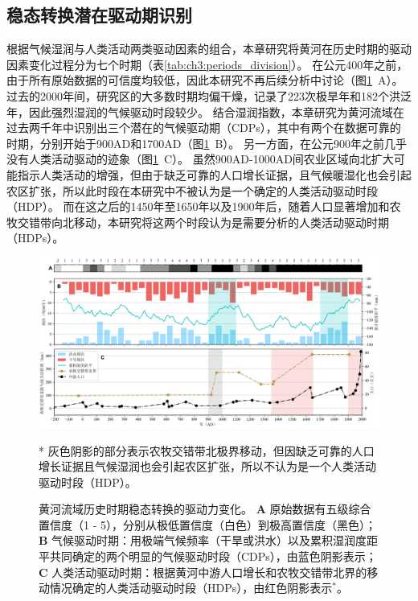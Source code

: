 
\subsection{稳态转换潜在驱动期识别}

根据气候湿润与人类活动两类驱动因素的组合，本章研究将黄河在历史时期的驱动因素变化过程分为七个时期（表\ref{tab:ch3:periods_division}）。
在公元400年之前，由于所有原始数据的可信度均较低，因此本研究不再后续分析中讨论（图\ref{fig:ch3:drivers}~A）。
过去的2000年间，研究区的大多数时期均偏干燥，记录了223次极旱年和182个洪泛年，因此强烈湿润的气候驱动时段较少。
结合湿润指数，本章研究为黄河流域在过去两千年中识别出三个潜在的气候驱动期（CDPs），其中有两个在数据可靠的时期，分别开始于900AD和1700AD（图\ref{fig:ch3:drivers}~B）。
另一方面，在公元900年之前几乎没有人类活动驱动的迹象（图\ref{fig:ch3:drivers}~C）。
虽然900AD-1000AD间农业区域向北扩大可能指示人类活动的增强，但由于缺乏可靠的人口增长证据，且气候暖湿化也会引起农区扩张，所以此时段在本研究中不被认为是一个确定的人类活动驱动时段（HDP）。
而在这之后的1450年至1650年以及1900年后，随着人口显著增加和农牧交错带向北移动，本研究将这两个时段认为是需要分析的人类活动驱动时期（HDPs）。



\begin{figure}[!ht]
    \includegraphics[width=\textwidth]{img/ch3/ch3_drivers.png}
    \caption[黄河流域历史时期稳态转换的驱动力变化]{黄河流域历史时期稳态转换的驱动力变化。
    \textbf{A} 原始数据有五级综合置信度（1 - 5），分别从极低置信度（白色）到极高置信度（黑色）；
    \textbf{B} 气候驱动时期：用极端气候频率（干旱或洪水）以及累积湿润度距平共同确定的两个明显的气候驱动时段（CDPs），由蓝色阴影表示；
    \textbf{C} 人类活动驱动时期：根据黄河中游人口增长和农牧交错带北界的移动情况确定的人类活动驱动时段（HDPs），由红色阴影表示$^*$。}
    \footnotesize
    * 灰色阴影的部分表示农牧交错带北极界移动，但因缺乏可靠的人口增长证据且气候湿润也会引起农区扩张，所以不认为是一个人类活动驱动时段（HDP）。\label{fig:ch3:drivers}
\end{figure}

